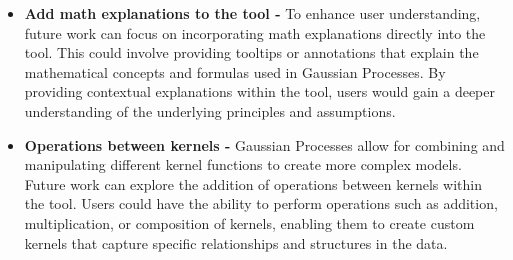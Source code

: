 \documentclass[preprint,journal]{vgtc}       %
\begin{document}
\begin{itemize}
  \item \textbf{Add math explanations to the tool -} To enhance user understanding, future work can focus on incorporating math explanations directly into the tool. This could involve providing tooltips or annotations that explain the mathematical concepts and formulas used in Gaussian Processes. By providing contextual explanations within the tool, users would gain a deeper understanding of the underlying principles and assumptions.

  \item \textbf{ Operations between kernels -} Gaussian Processes allow for combining and manipulating different kernel functions to create more complex models. Future work can explore the addition of operations between kernels within the tool. Users could have the ability to perform operations such as addition, multiplication, or composition of kernels, enabling them to create custom kernels that capture specific relationships and structures in the data.
\end{itemize}





% 
% 
%
%


\end{document}
